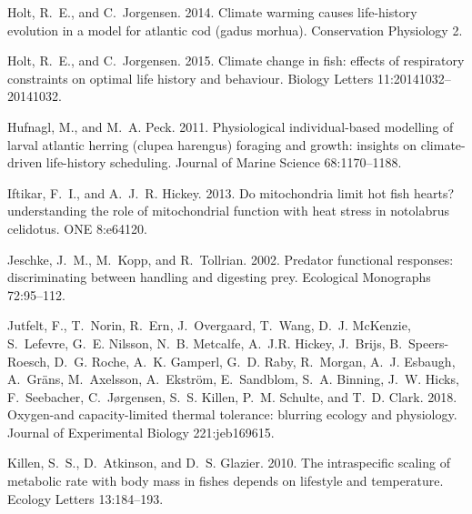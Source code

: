 \documentclass[11pt]{article}\usepackage[]{graphicx}\usepackage[]{color,soul}
\begin{document}
\begin{thebibliography}{62}
Holt, R.~E., and C.~Jorgensen. 2014.
\newblock Climate warming causes life-history evolution in a model for atlantic
  cod (gadus morhua).
\newblock Conservation Physiology 2.

Holt, R.~E., and C.~Jorgensen. 2015.
\newblock Climate change in fish: effects of respiratory constraints on optimal
  life history and behaviour.
\newblock Biology Letters 11:20141032--20141032.

Hufnagl, M., and M.~A. Peck. 2011.
\newblock Physiological individual-based modelling of larval atlantic herring
  (clupea harengus) foraging and growth: insights on climate-driven
  life-history scheduling.
 Journal of Marine Science 68:1170--1188.

Iftikar, F.~I., and A.~J.~R. Hickey. 2013.
\newblock Do mitochondria limit hot fish hearts? understanding the role of
  mitochondrial function with heat stress in notolabrus celidotus.
 {ONE} 8:e64120.

Jeschke, J.~M., M.~Kopp, and R.~Tollrian. 2002.
\newblock Predator functional responses: discriminating between handling and
  digesting prey.
\newblock Ecological Monographs 72:95--112.

Jutfelt, F., T.~Norin, R.~Ern, J.~Overgaard, T.~Wang, D.~J. {McKenzie},
  S.~Lefevre, G.~E. Nilsson, N.~B. Metcalfe, A.~J.R. Hickey, J.~Brijs, B.~Speers-Roesch, D.~G. Roche, A.~K. Gamperl, G.~D. Raby, R.~Morgan, A.~J. Esbaugh, A.~Gr{\"a}ns, M.~Axelsson, A.~Ekstr{\"o}m, E.~Sandblom, S.~A. Binning, J.~W. Hicks, F.~Seebacher, C.~J{\o}rgensen, S.~S. Killen, P.~M. Schulte, and T.~D. Clark. 2018.
\newblock Oxygen-and capacity-limited thermal tolerance: blurring ecology and
  physiology.
\newblock Journal of Experimental Biology 221:jeb169615.

Killen, S.~S., D.~Atkinson, and D.~S. Glazier. 2010.
\newblock The intraspecific scaling of metabolic rate with body mass in fishes
  depends on lifestyle and temperature.
\newblock Ecology Letters 13:184--193.


\end{thebibliography}
\end{document}
